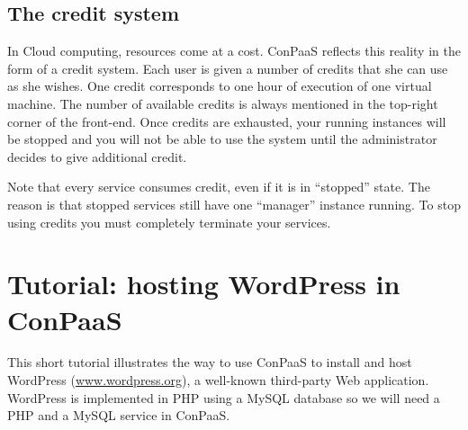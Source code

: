 \documentclass[10pt]{article}
\begin{document}
\subsection{The credit system}

In Cloud computing, resources come at a cost. ConPaaS reflects this
reality in the form of a credit system. Each user is given a number of
credits that she can use as she wishes. One credit corresponds to one
hour of execution of one virtual machine. The number of available
credits is always mentioned in the top-right corner of the front-end.
Once credits are exhausted, your running instances will be stopped and
you will not be able to use the system until the administrator decides
to give additional credit.

Note that every service consumes credit, even if it is in ``stopped''
state. The reason is that stopped services still have one ``manager''
instance running. To stop using credits you must completely terminate
your services.

\section{Tutorial: hosting WordPress in ConPaaS}

This short tutorial illustrates the way to use ConPaaS to install and
host WordPress (\url{www.wordpress.org}), a well-known third-party Web
application. WordPress is implemented in PHP using a MySQL database so
we will need a PHP and a MySQL service in ConPaaS.
\end{document}

